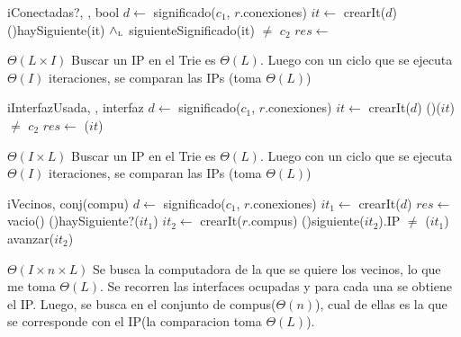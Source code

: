 \begin{Algoritmos}
  \nuevoAlgo
  \begin{algoritmo}{iConectadas?}{, , }{bool}{}
     $d \gets$ significado($c_1$, $r$.conexiones) 
     $it \gets$ crearIt($d$) 
    \While(){haySiguiente(it) $\land_{\mathrm{\scriptscriptstyle{L}}}$ siguienteSignificado(it) $\neq$ $c_2$}{
       
    }
    $res \gets$  
  \end{algoritmo}  
  \datosAlgoritmo{} %
  {} %
  {} %
  {$\Theta(L \times I)$} %
  {Buscar un IP en el Trie es $\Theta(L)$. Luego con un ciclo que se ejecuta $\Theta(I)$ iteraciones, se comparan las IPs (toma $\Theta(L)$)} %

  \nuevoAlgo
  \begin{algoritmo}{iInterfazUsada}{, , }{interfaz}{}
     $d \gets$ significado($c_1$, $r$.conexiones) 
     $it \gets$ crearIt($d$) 
    \While(){\sigSignif($it$) $\neq$ $c_2$}{
       
    }
    $res \gets$ \sigClave($it$) 
  \end{algoritmo}  
  \datosAlgoritmo{} %
  {} %
  {} %
  {$\Theta(I \times L)$} %
  {Buscar un IP en el Trie es $\Theta(L)$. Luego con un ciclo que se ejecuta $\Theta(I)$ iteraciones, se comparan las IPs (toma $\Theta(L)$)} %
  
  \nuevoAlgo  
  \begin{algoritmo}{iVecinos}{, }{conj(compu)}{}
     $d \gets$ significado($c_1$, $r$.conexiones) 
     $it_1 \gets$ crearIt($d$) 
    $res \gets$ vacio() 
    \While(){haySiguiente?($it_1$)}{
       $it_2 \gets$ crearIt($r$.compus) 
      \While(){siguiente($it_2$).IP $\neq$ \sigClave($it_1$)}{
        avanzar($it_2$) 
      }
       
     } 
  \end{algoritmo}
  \datosAlgoritmo{} %
  {} %
  {} %
  {$\Theta(I \times n \times L)$} %
  {Se busca la computadora de la que se quiere los vecinos, lo que me toma $\Theta(L)$. Se recorren las interfaces ocupadas y para cada una se obtiene el IP. Luego, se busca en el conjunto de compus($\Theta(n)$), cual de ellas es la que se corresponde con el IP(la comparacion toma $\Theta(L)$).} %
  


\end{Algoritmos}
